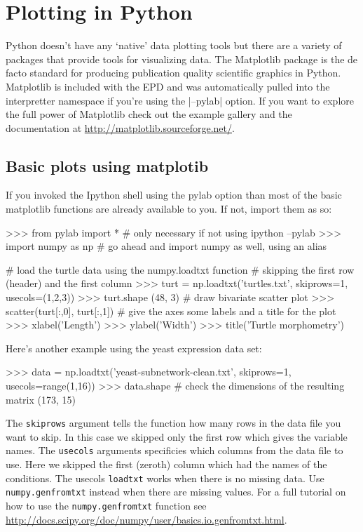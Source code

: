 
\section{Plotting in Python}

Python doesn't have any `native' data plotting tools but there are a
variety of packages that provide tools for visualizing data. The Matplotlib package is the de facto standard for producing
publication quality scientific graphics in Python. Matplotlib is
included with the EPD and was automatically pulled into the interpretter
namespace if you're using the \ipython |--pylab| option. If you want to explore the full power of Matplotlib check out the example
gallery and the documentation at
\url{http://matplotlib.sourceforge.net/}.

\subsection{Basic plots using matplotib}

If you invoked the Ipython shell using the pylab option than most of the
basic matplotlib functions are already available to you. If not, import
them as so:

\begin{python}
>>> from pylab import * # only necessary if not using ipython --pylab
>>> import numpy as np # go ahead and import numpy as well, using an alias

# load the turtle data using the numpy.loadtxt function 
# skipping the first row (header) and the first column 
>>> turt = np.loadtxt('turtles.txt', skiprows=1, 
                      usecols=(1,2,3))
>>> turt.shape
(48, 3)
# draw bivariate scatter plot
>>> scatter(turt[:,0], turt[:,1])
# give the axes some labels and a title for the plot
>>> xlabel('Length')
>>> ylabel('Width')
>>> title('Turtle morphometry')
\end{python}

Here's another example using the yeast expression data set:
%
\begin{python}
>>> data = np.loadtxt('yeast-subnetwork-clean.txt', 
                      skiprows=1, usecols=range(1,16))
>>> data.shape   # check the dimensions of the resulting matrix
(173, 15)
\end{python}
The \lstinline!skiprows! argument tells the function how many rows in
the data file you want to skip. In this case we skipped only the first
row which gives the variable names. The \lstinline!usecols! arguments
specificies which columns from the data file to use. Here we skipped the
first (zeroth) column which had the names of the conditions. The usecols
\lstinline!loadtxt! works when there is no missing data. Use
\lstinline!numpy.genfromtxt! instead when there are missing values. For
a full tutorial on how to use the \lstinline!numpy.genfromtxt! function
see
\url{http://docs.scipy.org/doc/numpy/user/basics.io.genfromtxt.html}.

